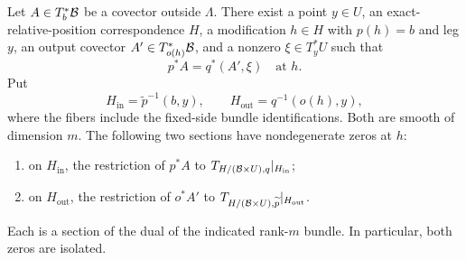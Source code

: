 \begin{proposition}\label{prop:transverse-hecke}
Let $A\in T^*_{b}\mathcal B$ be a covector outside $\Lambda$.  There exist a
point $y\in U$, an exact-relative-position correspondence $H$, a
modification $h\in H$ with $p(h)=b$ and leg $y$, an output covector
$A'\in T^*_{o(h)}\mathcal B$, and a nonzero $\xi\in T^*_yU$ such that
\begin{equation}\label{eq:geometry-covector-identity}
                         p^*A=q^*(A',\xi)\quad\text{at }h.
\end{equation}
Put
\[
 H_{\mathrm{in}}=\widetilde p^{-1}(b,y),\qquad
 H_{\mathrm{out}}=q^{-1}(o(h),y),
\]
where the fibers include the fixed-side bundle identifications.  Both
are smooth of dimension $m$.  The following two sections have
nondegenerate zeros at $h$:
\begin{enumerate}
\item on $H_{\mathrm{in}}$, the restriction of $p^*A$ to
      $T_{H/(\mathcal B\times U),q}|_{H_{\mathrm{in}}}$;
\item on $H_{\mathrm{out}}$, the restriction of $o^*A'$ to
      $T_{H/(\mathcal B\times U),\widetilde p}|_{H_{\mathrm{out}}}$.
\end{enumerate}
Each is a section of the dual of the indicated rank-$m$ bundle.
In particular, both zeros are isolated.
\end{proposition}

